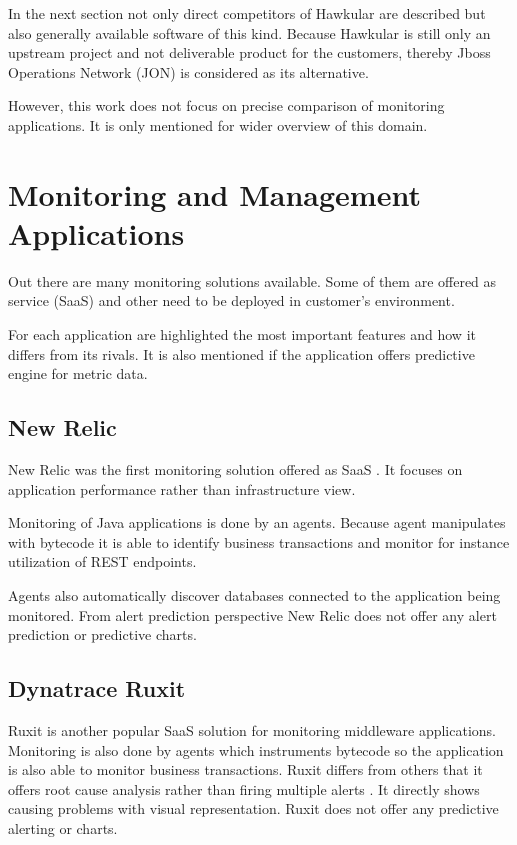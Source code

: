 In the next section not only direct competitors of Hawkular are described but also
generally available software of this kind. Because Hawkular is still only an upstream project and not deliverable
product for the customers, thereby Jboss Operations Network (JON) is considered as its alternative.

However, this work does not focus on precise comparison of monitoring applications. It is only mentioned for wider
overview of this domain.

    \section{Monitoring and Management Applications}
    Out there are many monitoring solutions available. Some of them are offered as service (SaaS) and other need to be
    deployed in customer's environment.

    For each application are highlighted the most important features and how it differs from its rivals. It is also
    mentioned if the application offers predictive engine for metric data.

        \subsection{New Relic}
        New Relic was the first monitoring solution offered as SaaS \cite{new-relic}. It focuses on application
        performance rather than infrastructure view.

        Monitoring of Java applications is done by an agents. Because agent manipulates with bytecode it is able to
        identify business transactions and monitor for instance utilization of REST endpoints.

        Agents also automatically discover databases connected to the application being monitored. From alert
        prediction perspective New Relic does not offer any alert prediction or predictive charts.

        \subsection{Dynatrace Ruxit}
        Ruxit is another popular SaaS solution for monitoring middleware applications. Monitoring is also done by agents
        which instruments bytecode so the application is also able to monitor business transactions. Ruxit differs from
        others that it offers root cause analysis rather than firing multiple alerts \cite{ruxit}. It directly shows
        causing problems with visual representation. Ruxit does not offer any predictive alerting or charts.

